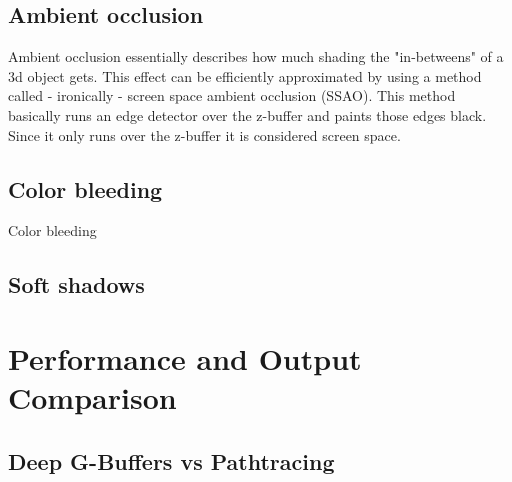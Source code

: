 \documentclass{ACGSeminar}
\begin{document}
	\subsection{Ambient occlusion}
		Ambient occlusion essentially describes how much shading the "in-betweens" of a 3d object gets. This effect can be efficiently approximated by using a method called - ironically - screen space ambient occlusion (SSAO). This method basically runs an edge detector over the z-buffer and paints those edges black. Since it only runs over the z-buffer it is considered screen space.
	\subsection{Color bleeding}
		Color bleeding
	\subsection{Soft shadows}

\section{Performance and Output Comparison}
	\subsection{Deep G-Buffers vs Pathtracing}

%

\printbibliography
\end{document}
